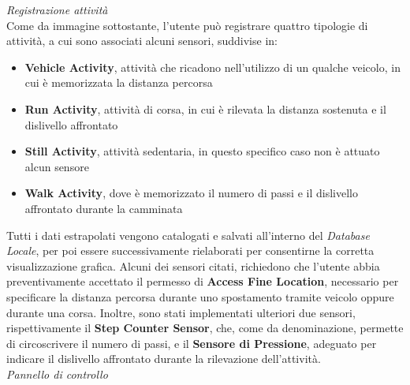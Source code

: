 \documentclass{article}
\begin{document}
    \textit{Registrazione attività} \vspace*{7pt}\\
    Come da immagine sottostante, l'utente può registrare quattro tipologie di attività, a cui sono associati alcuni sensori, suddivise in:
    \begin{itemize}
        \renewcommand{\labelitemi}{-}
        \item \textbf{Vehicle Activity}, attività che ricadono nell'utilizzo di un qualche veicolo, in cui è memorizzata la distanza percorsa
        \item \textbf{Run Activity}, attività di corsa, in cui è rilevata la distanza sostenuta e il dislivello affrontato
        \item \textbf{Still Activity}, attività sedentaria, in questo specifico caso non è attuato alcun sensore
        \item \textbf{Walk Activity}, dove è memorizzato il numero di passi e il dislivello affrontato durante la camminata
    \end{itemize}
    \begin{center}
        \begin{figure}[H]
            \centering
        \end{figure}
    \end{center}
    Tutti i dati estrapolati vengono catalogati e salvati all'interno del \textit{Database Locale}, per poi essere successivamente rielaborati per consentirne la corretta
    visualizzazione grafica. Alcuni dei sensori citati, richiedono che l'utente abbia preventivamente accettato il permesso di \textbf{Access Fine Location}, necessario per
    specificare la distanza percorsa durante uno spostamento tramite veicolo oppure durante una corsa.
    Inoltre, sono stati implementati ulteriori due sensori, rispettivamente il \textbf{Step Counter Sensor}, che, come da denominazione, permette di circoscrivere il numero di passi,
    e il \textbf{Sensore di Pressione}, adeguato per indicare il dislivello affrontato durante la rilevazione dell'attività.
    \vspace*{7pt}\\
    \textit{Pannello di controllo} \vspace*{7pt}\\
\end{document}
